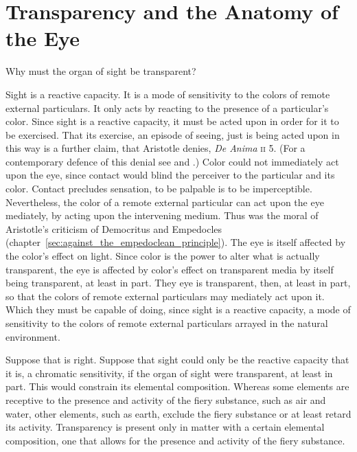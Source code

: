 
\section{Transparency and the Anatomy of the Eye} %
\label{sec:transparency_and_the_anatomy_of_the_eye}

Why must the organ of sight be transparent?

Sight is a reactive capacity. It is a mode of sensitivity to the colors of remote external particulars. It only acts by reacting to the presence of a particular's color. Since sight is a reactive capacity, it must be acted upon in order for it to be exercised. That its exercise, an episode of seeing, just is being acted upon in this way is a further claim, that Aristotle denies, \emph{De Anima} \textsc{ii} 5. (For a contemporary defence of this denial see \citealt{Travis:2009fk} and \citealt{Kalderon:2012fk}.) Color could not immediately act upon the eye, since contact would blind the perceiver to the particular and its color. Contact precludes sensation, to be palpable is to be imperceptible. Nevertheless, the color of a remote external particular can act upon the eye mediately, by acting upon the intervening medium. Thus was the moral of Aristotle's criticism of Democritus and Empedocles (chapter~\ref{sec:against_the_empedoclean_principle}). The eye is itself affected by the color's effect on light. Since color is the power to alter what is actually transparent, the eye is affected by color's effect on transparent media by itself being transparent, at least in part. They eye is transparent, then, at least in part, so that the colors of remote external particulars may mediately act upon it. Which they must be capable of doing, since sight is a reactive capacity, a mode of sensitivity to the colors of remote external particulars arrayed in the natural environment.

Suppose that is right. Suppose that sight could only be the reactive capacity that it is, a chromatic sensitivity, if the organ of sight were transparent, at least in part. This would constrain its elemental composition. Whereas some elements are receptive to the presence and activity of the fiery substance, such as air and water, other elements, such as earth, exclude the fiery substance or at least retard its activity. Transparency is present only in matter with a certain elemental composition, one that allows for the presence and activity of the fiery substance.

